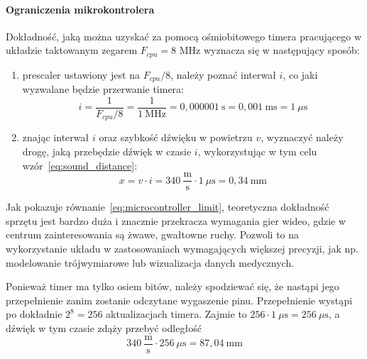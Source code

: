\paragraph{Ograniczenia mikrokontrolera}
\label{section:microcontroller_limit}

Dokładność, jaką można uzyskać za pomocą ośmiobitowego timera pracującego w układzie taktowanym zegarem $F_{cpu} = 8$ MHz wyznacza się w następujący sposób:
\begin{enumerate}
 \item {}prescaler ustawiony jest na $F_{cpu}/8$, należy poznać interwał $i$, co jaki wyzwalane będzie przerwanie timera:
    \begin{equation}
      i = \frac{1}{F_{cpu}/8} = \frac{1}{1~\textrm{MHz}} = 0,000001~\textrm{s} = 0,001~\textrm{ms} = 1~\mu\textrm{s}
      \label{eq:sampling_frequency}
    \end{equation}

 \item znając interwał $i$ oraz szybkość dźwięku w powietrzu $v$, wyznaczyć należy drogę, jaką przebędzie dźwięk w czasie $i$, wykorzystując w tym celu wzór~\ref{eq:sound_distance}:
    \begin{equation}
      x = v \cdot i = 340~\frac{\textrm{m}}{\textrm{s}} \cdot 1~\mu\textrm{s} = 0,34~\textrm{mm}
      \label{eq:microcontroller_limit}
    \end{equation}
\end{enumerate}

Jak pokazuje równanie~\ref{eq:microcontroller_limit}, teoretyczna dokładność sprzętu jest bardzo duża i znacznie przekracza wymagania gier wideo, gdzie w centrum zainteresowania są żwawe, gwałtowne ruchy. Pozwoli to na wykorzystanie układu w zastosowaniach wymagających większej precyzji, jak np. modelowanie trójwymiarowe lub wizualizacja danych medycznych.

Ponieważ timer ma tylko osiem bitów, należy spodziewać się, że nastąpi jego przepełnienie zanim zostanie odczytane wygaszenie pinu. Przepełnienie wystąpi po dokładnie $2^8 = 256$ aktualizacjach timera. Zajmie to $256 \cdot 1~\mu\textrm{s} = 256~\mu\textrm{s}$, a dźwięk w tym czasie zdąży przebyć odległość 
\begin{equation}
 340~\frac{\textrm{m}}{\textrm{s}} \cdot 256~\mu\textrm{s} = 87,04~\textrm{mm}
\end{equation}

